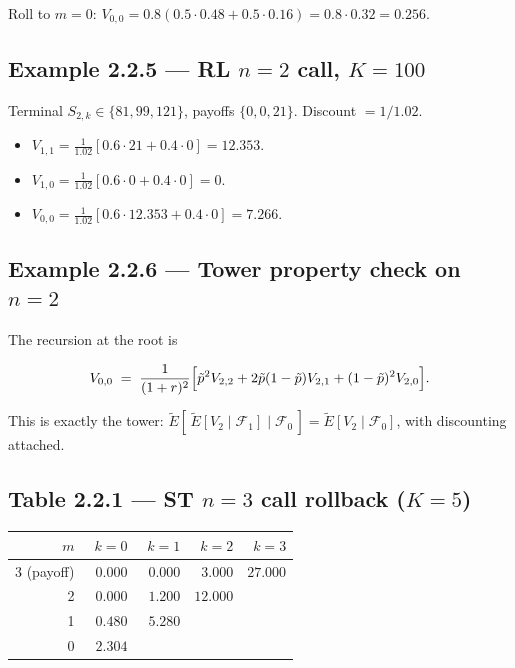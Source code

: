 \documentclass[
  10pt,
  twoside]{book}
\newcounter{none} %
\providecommand{\tightlist}{%
  \setlength{\itemsep}{0pt}\setlength{\parskip}{0pt}}
\begin{document}
Roll to \(m=0\):
\(V_{0,0}=0.8(0.5\cdot 0.48+0.5\cdot 0.16)=0.8\cdot 0.32=\boxed{0.256}\).

\subsection{\texorpdfstring{Example 2.2.5 --- RL \(n=2\) call,
\(K=100\)}{Example 2.2.5 --- RL n=2 call, K=100}}\label{example-2.2.5-rl-n2-call-k100}

Terminal \(S_{2,k}\in\{81,99,121\}\), payoffs \(\{0,0,21\}\). Discount
\(=1/1.02\).

\begin{itemize}
\tightlist
\item
  \(V_{1,1}=\frac{1}{1.02}[0.6\cdot 21+0.4\cdot 0]=12.353\).
\item
  \(V_{1,0}=\frac{1}{1.02}[0.6\cdot 0+0.4\cdot 0]=0\).
\item
  \(V_{0,0}=\frac{1}{1.02}[0.6\cdot 12.353+0.4\cdot 0]=\boxed{7.266}\).
\end{itemize}

\subsection{\texorpdfstring{Example 2.2.6 --- Tower property check on
\(n=2\)}{Example 2.2.6 --- Tower property check on n=2}}\label{example-2.2.6-tower-property-check-on-n2}

The recursion at the root is

\[
V_{0,0} \;=\; \frac{1}{(1+r)^2}\Bigl[\tilde p^2 V_{2,2} + 2\tilde p(1-\tilde p) V_{2,1} + (1-\tilde p)^2 V_{2,0}\Bigr].
\]

This is exactly the tower:
\(\tilde E[\,\tilde E[V_2\mid\mathcal F_1]\mid\mathcal F_0\,] = \tilde E[V_2\mid\mathcal F_0]\),
with discounting attached.

\subsection{\texorpdfstring{Table 2.2.1 --- ST \(n=3\) call rollback
(\(K=5\))}{Table 2.2.1 --- ST n=3 call rollback (K=5)}}\label{table-2.2.1-st-n3-call-rollback-k5}

{\def\LTcaptype{none} %
\begin{table}[H]
\centering
\begin{tabular}{|r|r|r|r|r|}
\toprule
\(m\) & \(k=0\) & \(k=1\) & \(k=2\) & \(k=3\) \\
\midrule



3 (payoff) & \(\phantom{0}0.000\) & \(\phantom{0}0.000\) &
\(\phantom{0}3.000\) & \(27.000\) \\
2 & \(\phantom{0}0.000\) & \(\phantom{0}1.200\) & \(12.000\) & \\
1 & \(\phantom{0}0.480\) & \(\phantom{0}5.280\) & & \\
0 & \(\phantom{0}\mathbf{2.304}\) & & & \\
\bottomrule
\end{tabular}
\end{table}
}
\end{document}
